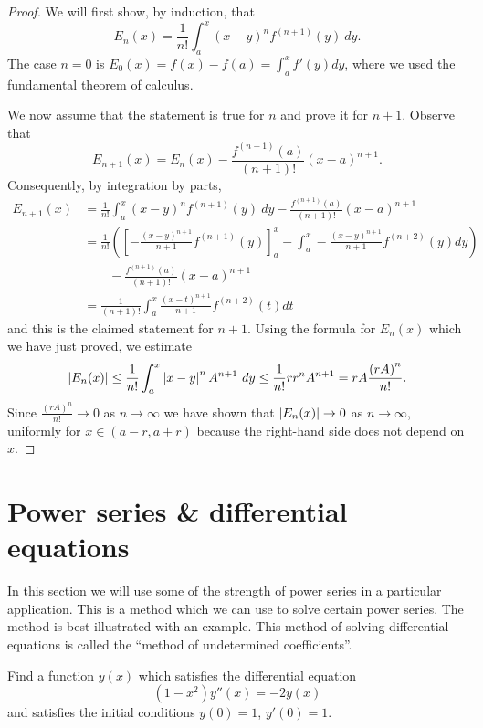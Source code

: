\begin{proof}
  We will first show, by induction, that
  \[
    E_n(x) = \frac{1}{n!} \int_{a}^{x} {(x-y)}^n f^{(n+1)}(y) \ dy.
  \]
  The case $n=0$ is \(E_0(x) = f(x) - f(a) = \int_a^x f'(y)dy\), where we used the fundamental theorem of calculus.
  
  We now assume that the statement is true for \(n\) and prove it for \(n+1\).
  Observe that
  \[
    E_{n+1}(x) = E_{n}(x) -   \frac{f^{(n+1)}(a)}{(n+1)!}{(x-a)}^{n+1}.
  \]
  Consequently, by integration by parts,
  \[
    \begin{aligned}
      E_{n+1}(x)
       & =
      \frac{1}{n!} \int_{a}^{x} {(x-y)}^n f^{(n+1)}(y) \ dy
      -   \frac{f^{(n+1)}(a)}{(n+1)!}{(x-a)}^{n+1} \\
       & =
      \frac{1}{n!} \left(\left[-\frac{(x-y)^{n+1}}{n+1}f^{(n+1)}(y)\right]_a^x - \int_a^x -\frac{(x-y)^{n+1}}{n+1}f^{(n+2)}(y)dy\right) \\
      &\qquad -   \frac{f^{(n+1)}(a)}{(n+1)!}{(x-a)}^{n+1} \\
       & =
      \frac{1}{(n+1)!} \int_a^x \frac{(x-t)^{n+1}}{n+1}f^{(n+2)}(t)dt
    \end{aligned}
  \]
  and this is the claimed statement for \(n+1\).
  Using the formula for \(E_n(x)\) which we have just proved, we estimate
  \[
    \left|E_n(x)\right|
    \leq \frac{1}{n!} \int_{a}^{x} \left|x-y\right|^n A^{n+1}  \ dy
    \leq \frac{1}{n!} r r^n  A^{n+1} = rA \frac{{(rA)}^n}{n!}.
  \]
  Since \(\frac{{(rA)}^n}{n!} \to 0\) as \(n\to \infty\) we have shown that \(\left|E_n(x)\right|  \to 0\) as \(n\to \infty\),
  uniformly for $x \in (a-r, a+r)$ because the right-hand side does not depend on $x$.
\end{proof}



\section{Power series \& differential equations}

In this section we will use some of the strength of power series in a particular application. This is a method which we can use to solve certain power series. The method is best illustrated with an example.
This method of solving differential equations is called the ``method of undetermined coefficients''.

\begin{task}
  Find a function \(y(x)\) which satisfies the differential equation
  \[
    (1-x^2)y''(x) = -2y(x)
  \]
  and satisfies the initial conditions \(y(0)=1\), \(y'(0)=1\).
\end{task}

